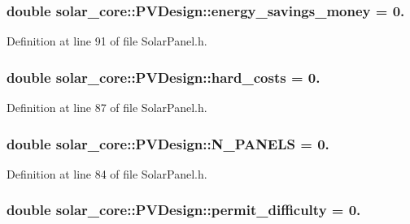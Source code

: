 \subsubsection[{energy\+\_\+savings\+\_\+money}]{\setlength{\rightskip}{0pt plus 5cm}double solar\+\_\+core\+::\+P\+V\+Design\+::energy\+\_\+savings\+\_\+money = 0.}\label{classsolar__core_1_1_p_v_design_a6b777b1d9dbd1f5a06b8d67d5204340b}


Definition at line 91 of file Solar\+Panel.\+h.

\hypertarget{classsolar__core_1_1_p_v_design_a18cec349cd8f04efcb67562e30416860}{}
\subsubsection[{hard\+\_\+costs}]{\setlength{\rightskip}{0pt plus 5cm}double solar\+\_\+core\+::\+P\+V\+Design\+::hard\+\_\+costs = 0.}\label{classsolar__core_1_1_p_v_design_a18cec349cd8f04efcb67562e30416860}


Definition at line 87 of file Solar\+Panel.\+h.

\hypertarget{classsolar__core_1_1_p_v_design_abef277ad010afb4ab6c6c13113a8c017}{}
\subsubsection[{N\+\_\+\+P\+A\+N\+E\+L\+S}]{\setlength{\rightskip}{0pt plus 5cm}double solar\+\_\+core\+::\+P\+V\+Design\+::\+N\+\_\+\+P\+A\+N\+E\+L\+S = 0.}\label{classsolar__core_1_1_p_v_design_abef277ad010afb4ab6c6c13113a8c017}


Definition at line 84 of file Solar\+Panel.\+h.

\hypertarget{classsolar__core_1_1_p_v_design_a8c2897033c697a6dcfb96787358dc64f}{}
\subsubsection[{permit\+\_\+difficulty}]{\setlength{\rightskip}{0pt plus 5cm}double solar\+\_\+core\+::\+P\+V\+Design\+::permit\+\_\+difficulty = 0.}\label{classsolar__core_1_1_p_v_design_a8c2897033c697a6dcfb96787358dc64f}


